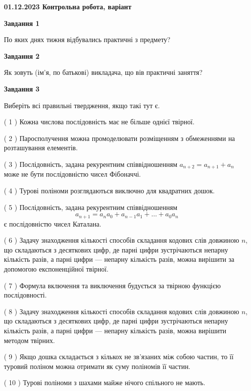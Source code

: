 \documentclass[12pt, ukrainian]{article}
\begin{document}
\begin {large}

\textbf{01.12.2023 Контрольна робота, варіант  }\par


{
{\begin {center}\textbf{Завдання 1}\end {center}}\par
По яких днях тижня відбувались практичні з предмету?\par
{\begin {center}\textbf{Завдання 2}\end {center}}\par
Як зовуть (ім'я, по батькові) викладача, що вів практичні заняття?\par
{\begin {center}\textbf{Завдання 3}\end {center}}\par
Виберіть всі правильні твердження, якщо такі тут є.\par
\vspace{2mm}
( 1 ) Кожна числова послідовність має не більше однієї твірної.%

( 2 ) Паросполучення можна промоделювати розміщенням з обмеженнями на розташування елементів.%

( 3 ) Послідовність, задана рекурентним співвідношенням $a_{n+2}=a_{n+1}+a_{n}$ може не бути послідовністю чисел Фібоначчі.%

( 4 ) Турові поліноми розглядаються виключно для квадратних дошок.%

( 5 ) Послідовність, задана рекурентним співвідношенням $$a_{n+1}=a_{n}a_{0}+a_{n-1}a_{1}+\ldots+a_0a_{n}$$ є послідовністю чисел Каталана.%

( 6 ) Задачу знаходження кількості способів складання кодових слів довжиною $n$, що складаються з десяткових цифр, де парні цифри зустрічаються непарну кількість разів, а парні цифри — непарну кількість разів, можна вирішити за допомогою експоненційної твірної.%

( 7 ) Формула включення та виключення будується за твірною функцією послідовності.%

( 8 ) Задачу знаходження кількості способів складання кодових слів довжиною $n$, що складаються з десяткових цифр, де парні цифри зустрічаються непарну кількість разів, а парні цифри — непарну кількість разів, можна вирішити методом твірних.%

( 9 ) Якщо дошка складається з кількох не зв’язаних між собою частин, то її туровий поліном можна отримати як суму поліномів її частин.%

( 10 ) Турові поліноми з шахами майже нічого спільного не мають.%
}
\end {large}

\vspace{4mm}
\newpage
\end{document}
